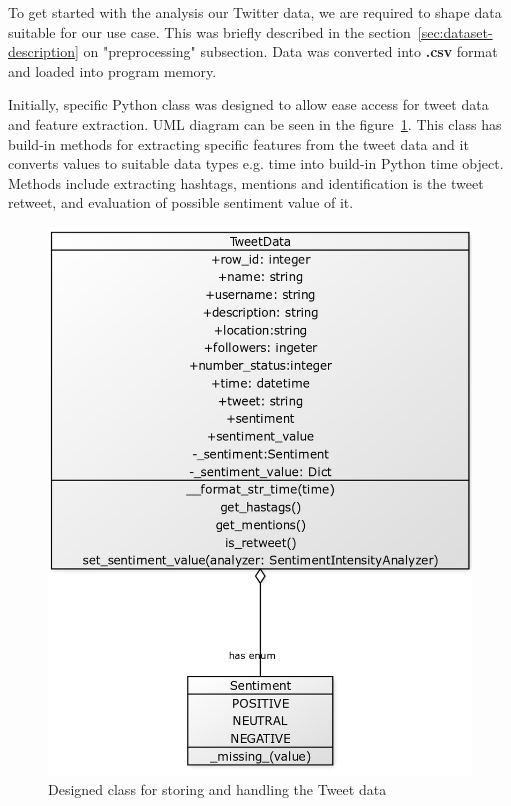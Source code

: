 \documentclass[conference]{IEEEtran}
\begin{document}
To get started with the analysis our Twitter data, we are required to shape data suitable for our use case.
This was briefly described in the section~\ref{sec:dataset-description} on "preprocessing" subsection.
Data was converted into \textbf{.csv} format and loaded into program memory.

Initially, specific Python class was designed to allow ease access for tweet data and feature extraction.
UML diagram can be seen in the figure~\ref{fig:tweetdata_design}.
This class has build-in methods for extracting specific features from the tweet data and it converts values to suitable data types e.g. time into build-in Python time object.
Methods include extracting hashtags, mentions and identification is the tweet retweet, and evaluation of possible sentiment value of it.

\begin{figure}
    \includegraphics[scale=0.3]{figures/uml_tweetdata}
    \caption{Designed class for storing and handling the Tweet data}
    \label{fig:tweetdata_design}
\end{figure}
\end{document}

